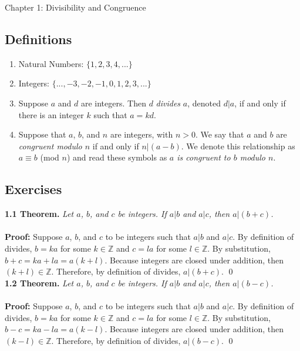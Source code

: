 \documentclass[12pt]{article}
\begin{document}
\thispagestyle{empty}
\pagestyle{empty}

\begin{center}
    Chapter 1: Divisibility and Congruence
\end{center}
\subsection*{Definitions}
\begin{enumerate}
\item Natural Numbers: $\{1, 2, 3, 4, ...\}$
\item Integers: $\{..., -3, -2, -1, 0, 1, 2, 3, ...\}$
\item Suppose $a$ and $d$ are integers. Then $d$ \emph{divides} $a$, denoted $d \vert a$, if and only if there is an integer $k$ such that $a = kd$. 
\item Suppose that $a$, $b$, and $n$ are integers, with $n > 0$. We say that $a$ and $b$ are \emph{congruent modulo $n$} if and only if $n \vert (a - b)$. We denote this relationship as $a \equiv b$ (mod $n$) and read these symbols as \emph{$a$ is congruent to $b$ modulo $n$}.
\end{enumerate}

\newpage
\subsection*{Exercises}
\noindent \textbf{1.1 Theorem.} 
\emph{Let  $a$, $b$, and $c$ be integers. 
If $a \vert b$ and $a \vert c$, then $a \vert (b+c)$.}
~\\
~\\
\textbf{Proof:}  
Suppose $a$, $b$, and $c$ to be integers such that $a \vert b$ and $a \vert c$. By definition of divides, $b = ka$ for some $k \in \mathbb{Z}$ and $c = la$ for some $l \in \mathbb{Z}$. By substitution, $b + c = ka + la = a (k + l)$. Because integers are closed under addition, then $(k + l) \in \mathbb{Z}$. Therefore, by definition of divides, $a \vert (b + c)$. \qed
~\\

\noindent \textbf{1.2 Theorem.} 
\emph{Let  $a$, $b$, and $c$ be integers. 
If $a \vert b$ and $a \vert c$, then $a \vert (b-c)$.}
~\\
~\\
\textbf{Proof:}
Suppose $a$, $b$, and $c$ to be integers such that $a \vert b$ and $a \vert c$. By definition of divides, $b = ka$ for some $k \in \mathbb{Z}$ and $c = la$ for some $l \in \mathbb{Z}$. By substitution, $b - c = ka - la = a (k - l)$. Because integers are closed under addition, then $(k - l) \in \mathbb{Z}$. Therefore, by definition of divides, $a \vert (b - c)$. \qed
~\\
\end{document}
